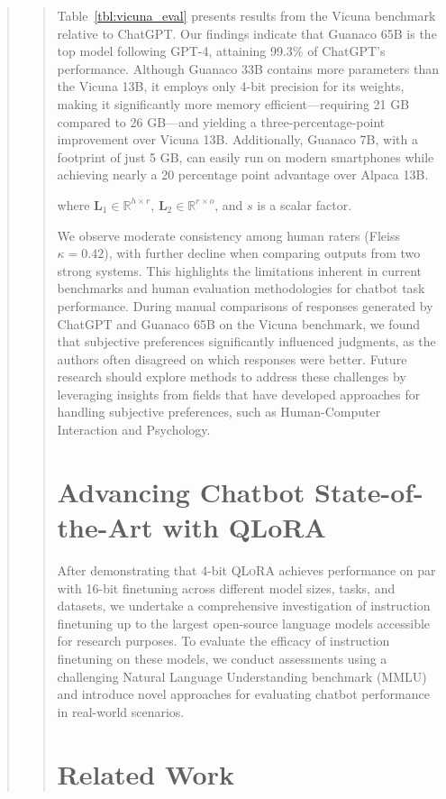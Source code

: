 \begin{quote}
\begin{quote}
Table~\ref{tbl:vicuna_eval} presents results from the Vicuna benchmark \cite{vicuna2023} relative to ChatGPT. Our findings indicate that {Guanaco} 65B is the top model following GPT-4, attaining 99.3\% of ChatGPT's performance. Although {Guanaco} 33B contains more parameters than the Vicuna 13B, it employs only 4-bit precision for its weights, making it significantly more memory efficient—requiring 21 GB compared to 26 GB—and yielding a three-percentage-point improvement over Vicuna 13B. Additionally, {Guanaco} 7B, with a footprint of just 5 GB, can easily run on modern smartphones while achieving nearly a 20 percentage point advantage over Alpaca 13B.

where $\mathbf{L}_1\in  \mathbb{R}^{h\times r}$, $\mathbf{L}_2\in  \mathbb{R}^{r\times o}$, and $s$ is a scalar factor.

We observe moderate consistency among human raters (Fleiss $\kappa=0.42$), with further decline when comparing outputs from two strong systems. This highlights the limitations inherent in current benchmarks and human evaluation methodologies for chatbot task performance. During manual comparisons of responses generated by ChatGPT and {Guanaco} 65B on the Vicuna benchmark, we found that subjective preferences significantly influenced judgments, as the authors often disagreed on which responses were better. Future research should explore methods to address these challenges by leveraging insights from fields that have developed approaches for handling subjective preferences, such as Human-Computer Interaction and Psychology.

\section{Advancing Chatbot State-of-the-Art with QLoRA}
\label{sec:pushing}
After demonstrating that 4-bit \textsc{QLoRA} achieves performance on par with 16-bit finetuning across different model sizes, tasks, and datasets, we undertake a comprehensive investigation of instruction finetuning up to the largest open-source language models accessible for research purposes. To evaluate the efficacy of instruction finetuning on these models, we conduct assessments using a challenging Natural Language Understanding benchmark (MMLU) and introduce novel approaches for evaluating chatbot performance in real-world scenarios.

\section{Related Work}


\end{quote}
\end{quote}

